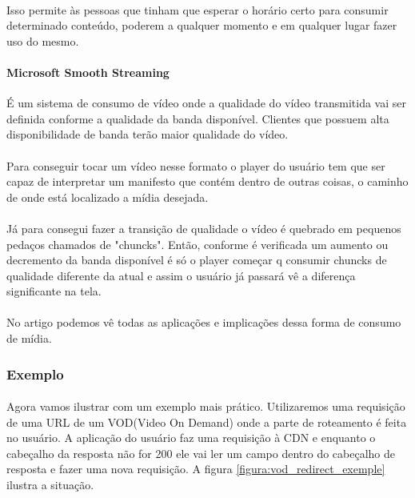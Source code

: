 \paragraph{} Isso permite \`as pessoas que tinham que esperar o hor\'ario certo para consumir determinado conte\'udo, poderem a qualquer momento e em qualquer lugar fazer uso do mesmo.
\paragraph{Microsoft Smooth Streaming} \'E um sistema de consumo de v\'ideo onde a qualidade do v\'ideo transmitida vai ser definida conforme a qualidade da banda dispon\'ivel. Clientes que possuem alta disponibilidade de banda ter\~ao maior qualidade do v\'ideo. 
\paragraph{} Para conseguir tocar um v\'ideo nesse formato o player do usu\'ario tem que ser capaz de interpretar um manifesto que cont\'em dentro de outras coisas, o caminho de onde est\'a localizado a m\'idia desejada. 
\paragraph{} J\'a para consegui fazer a transi\c{c}\~ao de qualidade o v\'ideo \'e quebrado em pequenos peda\c{c}os chamados de "chuncks". Ent\~ao, conforme \'e verificada um aumento ou decremento da banda dispon\'ivel \'e s\'o o player come\c{c}ar q consumir chuncks de qualidade diferente da atual e assim o usu\'ario j\'a passar\'a v\^e a diferen\c{c}a significante na tela. 
\paragraph{} No artigo \cite{zambelli2009iis} podemos v\^e todas as aplica\c{c}\~oes e implica\c{c}\~oes dessa forma de consumo de m\'idia.
\subsubsection{Exemplo}
\label{subsubsection:vod_exemplo}
\paragraph{} Agora vamos ilustrar com um exemplo mais pr\'atico. Utilizaremos uma requisi\c{c}\~ao de uma URL de um VOD(Video On Demand) onde a parte de roteamento \'e feita no usu\'ario. A aplica\c{c}\~ao do usu\'ario faz uma requisi\c{c}\~ao \`a CDN e enquanto o cabe\c{c}alho da resposta n\~ao for 200 ele vai ler um campo dentro do cabe\c{c}alho de resposta e fazer uma nova requisi\c{c}\~ao. A figura  \ref{figura:vod_redirect_exemple} ilustra a situa\c{c}\~ao.

